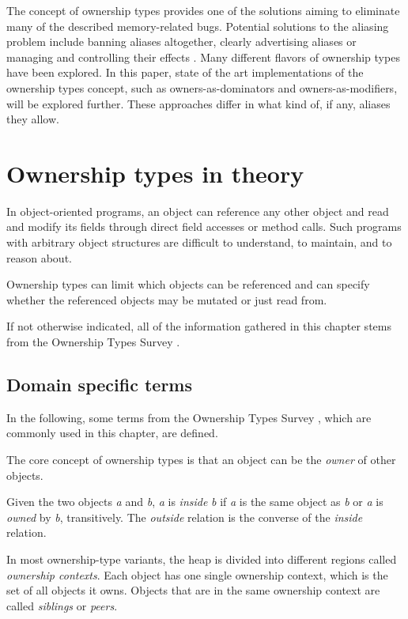 \documentclass[sigplan,11pt,nonacm]{acmart}
\begin{document}
The concept of ownership types provides one of the solutions aiming to eliminate many of the described memory-related bugs.
Potential solutions to the aliasing problem include banning aliases altogether, clearly advertising aliases or managing and controlling their effects \cite{ownership-types-survey}.
Many different flavors of ownership types have been explored.
In this paper, state of the art implementations of the ownership types concept, such as owners-as-dominators and owners-as-modifiers, will be explored further.
These approaches differ in what kind of, if any, aliases they allow.



\section{Ownership types in theory}
\label{sec:theory}

In object-oriented programs, an object can reference any other object and read and modify its fields through direct field accesses or method calls.
Such programs with arbitrary object structures are difficult to understand, to maintain, and to reason about. \cite{lightweight-ownership}

Ownership types can limit which objects can be referenced and can specify whether the referenced objects may be mutated or just read from.

If not otherwise indicated, all of the information gathered in this chapter stems from the Ownership Types Survey \cite{ownership-types-survey}.


\subsection{Domain specific terms}
\label{sec:domain-specific-terms}

In the following, some terms from the Ownership Types Survey \cite{ownership-types-survey}, which are commonly used in this chapter, are defined.

The core concept of ownership types is that an object can be the \emph{owner} of other objects.

Given the two objects \emph{a} and \emph{b}, \emph{a} is \emph{inside} \emph{b} if \emph{a} is the same object as \emph{b} or \emph{a} is \emph{owned} by \emph{b}, transitively.
The \emph{outside} relation is the converse of the \emph{inside} relation.

In most ownership-type variants, the heap is divided into different regions called \emph{ownership contexts}.
Each object has one single ownership context, which is the set of all objects it owns.
Objects that are in the same ownership context are called \emph{siblings} or \emph{peers}.
\end{document}
